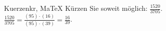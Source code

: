 \begin{MAufgabe}{Kuerzen}{kr, MaTeX}
K\"urzen Sie soweit m\"oglich: $\frac{1520}{3705}$.\\ 
\ifLsg\MLoesung
\quad $\frac{1520}{3705}=\frac{(95)\cdot(16)}{(95)\cdot(39)}=\frac{16}{39}$.\else\relax\fi
 \end{MAufgabe}